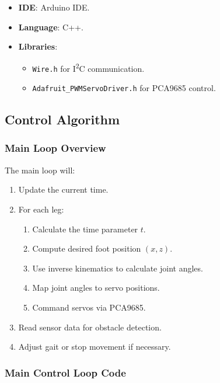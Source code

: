 \documentclass{article}
\begin{document}
\begin{itemize}
 \item \textbf{IDE}: Arduino IDE.
 \item \textbf{Language}: C++.
 \item \textbf{Libraries}:
 \begin{itemize}
     \item \texttt{Wire.h} for I\textsuperscript{2}C communication.
     \item \texttt{Adafruit\_PWMServoDriver.h} for PCA9685 control.
 \end{itemize}
\end{itemize}

\subsection{Control Algorithm}

\subsubsection{Main Loop Overview}

The main loop will:

\begin{enumerate}
 \item Update the current time.
 \item For each leg:
 \begin{enumerate}
     \item Calculate the time parameter $t$.
     \item Compute desired foot position $(x, z)$.
     \item Use inverse kinematics to calculate joint angles.
     \item Map joint angles to servo positions.
     \item Command servos via PCA9685.
 \end{enumerate}
 \item Read sensor data for obstacle detection.
 \item Adjust gait or stop movement if necessary.
\end{enumerate}

\subsubsection{Main Control Loop Code}
\end{document}
